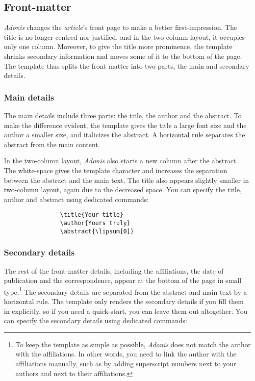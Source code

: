 \documentclass{adonis}
\begin{document}
		\subsection{Front-matter}
		
			\textit{Adonis} changes the \textit{article}'s front page to make a better first-impression.
			The title is no longer centred nor justified, and in the two-column layout, it occupies only one column.
			Moreover, to give the title more prominence, the template shrinks secondary information and moves some of it to the bottom of the page.
			The template thus splits the front-matter into two parts, the main and secondary details.
			
			\subsubsection{Main details}
			
			The main details include three parts: the title, the author and the abstract.
			To make the difference evident, the template gives the title a large font size and the author a smaller size, and italicizes the abstract.
			A horizontal rule separates the abstract from the main content.
			
			In the two-column layout, \textit{Adonis} also starts a new column after the abstract.
			The white-space gives the template character and increases the separation between the abstract and the main text.
			The title also appears slightly smaller in two-column layout, again due to the decreased space.
			You can specify the title, author and abstract using dedicated commands:
			
			\begin{verbatim}
				\title{Your title}
				\author{Yours truly}
				\abstract{\lipsum[0]}
			\end{verbatim}
			
			\subsubsection{Secondary details}
			
			The rest of the front-matter details, including the affiliations, the date of publication and the correspondence, appear at the bottom of the page in small type.\footnote{
				To keep the template as simple as possible, \textit{Adonis} does not match the author with the affiliations.
				In other words, you need to link the author with the affiliations manually, such as by adding superscript numbers next to your authors and next to their affiliations.
			}
			The secondary details are separated from the abstract and main text by a horizontal rule.
			The template only renders the secondary details if you fill them in explicitly, so if you need a quick-start, you can leave them out altogether.
			You can specify the secondary details using dedicated commands:
			
\end{document}
